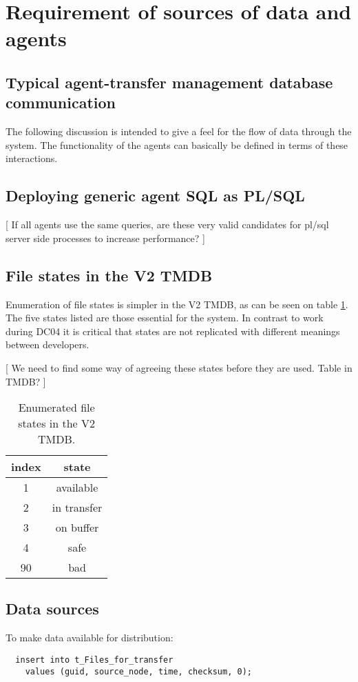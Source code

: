 \documentclass{cmspaper}
\begin{document}
\section{Requirement of sources of data and agents}
\subsection{Typical agent-transfer management database communication}
The following discussion is intended to give a feel for the flow
of data through the system. The functionality of the agents can basically be defined in terms of these interactions.

\subsection{Deploying generic agent SQL as PL/SQL}
[ If all agents use the same queries, are these very valid candidates for pl/sql server side processes to increase performance? ]

\subsection{File states in the V2 TMDB}
Enumeration of file states is simpler in the V2 TMDB, as can be seen on table \ref{table:states}. The five states listed are those essential for the system. In contrast to work during DC04 it is critical that states are not replicated with different meanings between developers. 

[ We need to find some way of agreeing these states before they are used. Table in TMDB? ]

\begin{table}
\centering
\begin{tabular}[!h]{|c|c|} 
\hline index & state
\\ \hline
	1	& 	available
\\ 	2	&	in transfer
\\	3	&	on buffer
\\	4	&	safe
\\	90	&	bad
\\ \hline
\end{tabular}
\caption{Enumerated file states in the V2 TMDB.}
\label{table:states}
\end{table}

\subsection{Data sources}
To make data available for distribution:
{\small\begin{verbatim}
  insert into t_Files_for_transfer
    values (guid, source_node, time, checksum, 0);
\end{verbatim}}
\end{document}
